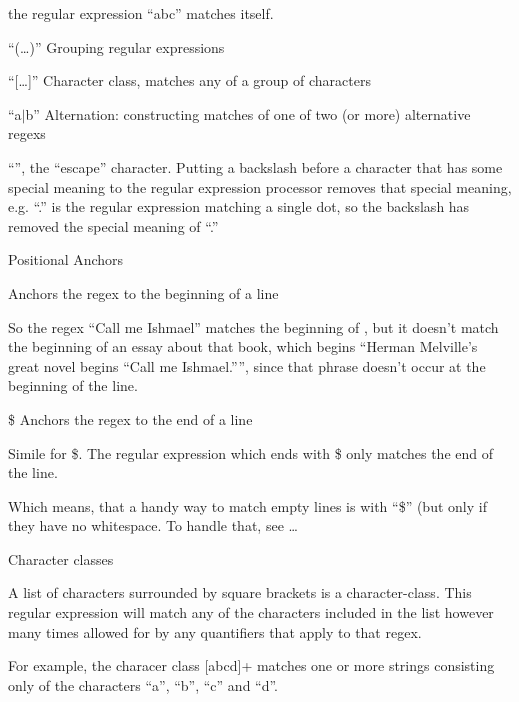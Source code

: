 		the regular expression ``abc'' matches itself.
  
       \item ``(\ldots)'' Grouping regular expressions

       \item ``[\ldots]'' Character class, matches any of a group of
  characters
        

	\item ``a$|$b'' Alternation: constructing matches of one of two
         (or more) alternative regexs


       \item ``\BS'', the ``escape'' character. Putting a backslash
  before a character that has some special meaning to the regular
  expression processor removes that special meaning, e.g. ``\BS .''  is
  the regular expression matching a single dot, so the backslash has
  removed the special meaning of ``.''

     \ei

    \item Positional Anchors
  
     \bi
  
       \item \caret Anchors the regex to the beginning of a line

	 So the regex ``\caret Call me Ishmael'' matches the beginning
  of , but it doesn't match the beginning of an essay
  about that book, which begins ``Herman Melville's great novel
   begins ``Call me Ishmael.'''', since that phrase
  doesn't occur at the beginning of the line.

       \item \$ Anchors the regex to the end of a line

        Simile for \$. The regular expression which ends with \$ only
  matches the end of the line.

   Which means, that a handy way to match empty lines is with
  ``\caret\$'' (but only if they have no whitespace. To handle that,
  see \ldots

  \ei 

  \item Character classes

      A list of characters surrounded by square brackets is a
  character-class. This regular expression will match any of the
  characters included in the list however many times allowed for by
  any quantifiers that apply to that regex.

    For example, the characer class [abcd]+ matches one or more
  strings consisting only of the characters ``a'', ``b'', ``c'' and
  ``d''. 

